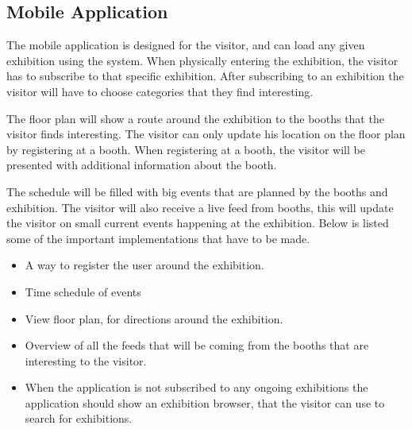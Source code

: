 \subsection*{Mobile Application}

The mobile application is designed for the visitor, and can load any given exhibition using the system. When physically entering the exhibition, the visitor has to subscribe to that specific exhibition. After subscribing to an exhibition the visitor will have to choose categories that they find interesting. 

The floor plan will show a route around the exhibition to the booths that the visitor finds interesting. The visitor can only update his location on the floor plan by registering at a booth. When registering at a booth, the visitor will be presented with additional information about the booth. 

The schedule will be filled with big events that are planned by the booths and exhibition. The visitor will also receive a live feed from booths, this will update the visitor on small current events happening at the exhibition. Below is listed some of the important implementations that have to be made.
\begin{itemize}
\item A way to register the user around the exhibition.
\item Time schedule of events
\item View floor plan, for directions around the exhibition.
\item Overview of all the feeds that will be coming from the booths that are interesting to the visitor.
\item When the application is not subscribed to any ongoing exhibitions the application should show an exhibition browser, that the visitor can use to search for exhibitions.
\end{itemize}